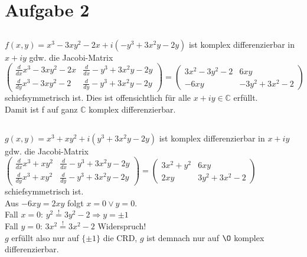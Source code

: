 
	\section{Aufgabe 2}
	
	\subsection{}
	$f(x,y)=x^3-3xy^2-2x+i(-y^3+3x^2y-2y) $ ist komplex differenzierbar in $x+iy$ gdw. die Jacobi-Matrix $\begin{pmatrix}
	\frac{d}{dx}x^3-3xy^2-2x & \frac{d}{dx}-y^3+3x^2y-2y\\ 
	\frac{d}{dy}x^3-3xy^2-2 & \frac{d}{dy}-y^3+3x^2y-2y
	\end{pmatrix}
	=\begin{pmatrix}
	3x^2-3y^2-2 & 6xy\\
    -6xy & -3y^2+3x^2-2
    \end{pmatrix}$ 
    schiefsymmetrisch ist. Dies ist offensichtlich für alle $x+iy \in \mathbb{C}$ erfüllt.\\
    Damit ist f auf ganz $\mathbb{C}$ komplex differenzierbar.
    
    \subsection{}
    $g(x,y)=x^3+xy^2+i(y^3+3x^2y-2y) $ ist komplex differenzierbar in $x+iy$ gdw. die Jacobi-Matrix $\begin{pmatrix}
	\frac{d}{dx}x^3+xy^2 & \frac{d}{dx}-y^3+3x^2y-2y\\ 
	\frac{d}{dy}x^3+xy^2 & \frac{d}{dy}-y^3+3x^2y-2y
	\end{pmatrix}
	=\begin{pmatrix}
	3x^2+y^2 & 6xy\\
    2xy & 3y^2+3x^2-2
    \end{pmatrix}$ 
    schiefsymmetrisch ist.\\
    Aus $-6xy=2xy$ folgt $x=0 \lor y=0$.\\
    Fall $x=0$: $y^2\stackrel{!}{=} 3y^2-2\Rightarrow y=\pm1$\\
    Fall $y=0$: $3x^2\stackrel{!}{=} 3x^2-2$ Widerspruch!\\
    $g$ erfüllt also nur auf $\{ \pm1 \}$ die CRD, $g$ ist demnach nur auf $\O$ komplex differenzierbar.
    \subsection{}